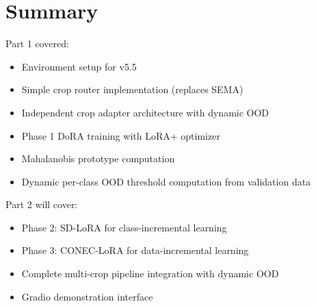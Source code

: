 \documentclass[11pt,a4paper]{article}
\begin{document}
\section{Summary}

Part 1 covered:
\begin{itemize}[leftmargin=*]
    \item Environment setup for v5.5
    \item Simple crop router implementation (replaces SEMA)
    \item Independent crop adapter architecture with dynamic OOD
    \item Phase 1 DoRA training with LoRA+ optimizer
    \item Mahalanobis prototype computation
    \item Dynamic per-class OOD threshold computation from validation data
\end{itemize}

Part 2 will cover:
\begin{itemize}[leftmargin=*]
    \item Phase 2: SD-LoRA for class-incremental learning
    \item Phase 3: CONEC-LoRA for data-incremental learning
    \item Complete multi-crop pipeline integration with dynamic OOD
    \item Gradio demonstration interface
\end{itemize}
\end{document}
